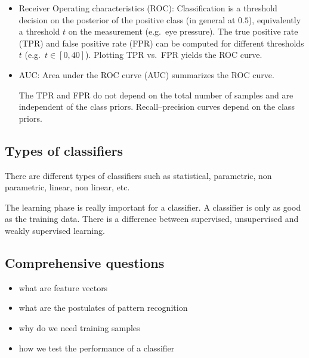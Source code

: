 \documentclass{article}
\begin{document}
\begin{itemize}
\begin{itemize}
        {\small
        \begin{displaymath}
           \mathsf{ACC} = \frac{\#\mathsf{TP} + \#\mathsf{TN}}{\#\mathsf{TP} + \#\mathsf{FP} + \#\mathsf{FN} + \#\mathsf{TN}}
        \end{displaymath}
        }
    \item F-measure: harmonic mean of recall and precision:
        {\small
        \begin{displaymath}
           F = \frac{2 \cdot \mathsf{recall} \cdot \mathsf{precision}}{\mathsf{recall} + \mathsf{precision}}
        \end{displaymath}
        }
\end{itemize}
\item Receiver Operating characteristics (ROC):
Classification is a threshold decision on the posterior of the positive class (in general at $0.5$), equivalently a threshold $t$ on the measurement (e.g.\ eye pressure). The true positive rate (TPR) and false positive rate (FPR) can be computed for different thresholds $t$ (e.g.\ $t\in[0,40]$). Plotting TPR vs.\ FPR yields the ROC curve.

\item AUC: Area under the ROC curve (AUC) summarizes the ROC curve.

The TPR and FPR do not depend on the total number of samples and are independent of the class priors. Recall--precision curves depend on the class priors.
    \end{itemize}
    
\subsection{Types of classifiers}
There are different types of classifiers such as statistical, parametric, non parametric, linear, non linear, etc. 

The learning phase is really important for a classifier. A classifier is only as good as the training data. There is a difference between supervised, unsupervised and weakly supervised learning. 

\subsection{Comprehensive questions}
\begin{itemize}
    \item what are feature vectors
    \item what are the postulates of pattern recognition
    \item why do we need training samples
    \item how we test the performance of a classifier
\end{itemize}

\newpage

\newpage

\newpage

\newpage

\newpage

\newpage

\newpage
\printbibliography
\end{document}

